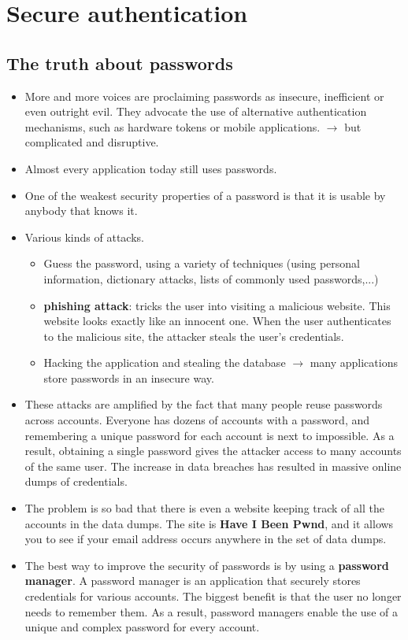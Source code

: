 \documentclass[../main.tex]{subfiles}
\begin{document}
\section{Secure authentication}
\subsection{The truth about passwords}
\begin{itemize}
\item More and more voices are proclaiming passwords as insecure, inefficient or even outright evil. They advocate the use of alternative authentication mechanisms, such as hardware tokens or mobile applications. $\rightarrow$ but complicated and disruptive.
\item Almost every application today still uses passwords.
\item One of the weakest security properties of a password is that it is usable by anybody that knows it.
\item Various kinds of attacks.
\begin{itemize}
\item Guess the password, using a variety of techniques (using personal information, dictionary attacks, lists of commonly used passwords,...)
\item \textbf{phishing attack}: tricks the user into visiting a malicious website. This website looks exactly like an innocent one. When the user authenticates to the malicious site, the attacker steals the user’s credentials.
\item Hacking the application and stealing the database $\rightarrow$ many applications store passwords in an insecure way.
\end{itemize}
\item These attacks are amplified by the fact that many people reuse passwords across accounts. Everyone has dozens of accounts with a password, and remembering a unique password for each account is next to impossible. As a result, obtaining a single password gives the attacker access to many accounts of the same user. The increase in data breaches has resulted in massive online dumps of credentials.
\item The problem is so bad that there is even a website keeping track of all the accounts in the data dumps. The site is \textbf{Have I Been Pwnd}, and it allows you to see if your email address occurs anywhere in the set of data dumps.
\item The best way to improve the security of passwords is by using a \textbf{password manager}. A password manager is an application that securely stores credentials for various accounts. The biggest benefit is that the user no longer needs to remember them. As a result, password managers enable the use of a unique and complex password for every account.

\end{itemize}
\end{document}
